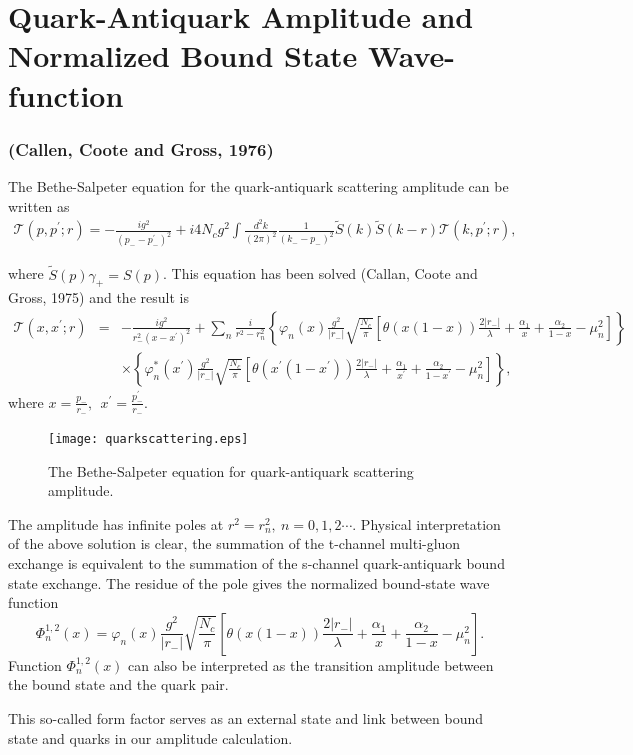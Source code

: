 \documentclass[8pt]{beamer}
\begin{document}
\section{Quark-Antiquark Amplitude and Normalized Bound State Wave-function}
\begin{frame}
	\frametitle{\insertsectionhead (Callen, Coote and Gross, 1976)}
	The Bethe-Salpeter equation for the quark-antiquark scattering amplitude can be written as
	\begin{eqnarray}
		\mathcal{T}(p,p^\prime;r)=-\frac{ig^2}{(p_{-}-p_{-}^\prime)^2}
		+i4N_c
		g^2\int\frac{d^2k}{(2\pi)^2}\frac{1}{(k_{-}-p_{-})^2}\tilde{S}(k)\tilde{S}(k-r)\mathcal{T}(k,p^\prime;r),\label{quarkeq}
	\end{eqnarray}

	where $\tilde{S}(p)\gamma_+=S(p)$. This equation has been solved (Callan, Coote and Gross, 1975) and the result is
	\small
	\begin{eqnarray}
		\mathcal{T}(x,x^\prime;r)
		&=&-\frac{ig^2}{r_{-}^2(x-x^\prime)^2}+\sum_{n}\frac{i}{r^2-r_{n}^2}\left\{\varphi_{n}(x)\frac{g^2}{|r_{-}|}
		\sqrt{\frac{N_c}{\pi}}\left[\theta(x(1-x))\frac{2|r_{-}|}{\lambda}+\frac{\alpha_1}{x}+\frac{\alpha_2}{1-x}-\mu_{n}^2\right]\right\}\nonumber\\
		&&\times\left\{\varphi_n^{\ast}(x^\prime)\frac{g^2}{|r_{-}|}\sqrt{\frac{N_c}{\pi}}
		\left[\theta(x^\prime(1-x^\prime))\frac{2|r_{-}|}{\lambda}+\frac{\alpha_1}{x^\prime}+\frac{\alpha_2}{1-x^\prime}-\mu_n^2\right]\right\},\label{qqamp}
	\end{eqnarray}
	\normalsize
	where $x=\frac{p_-}{r_-},\ \  x^\prime=\frac{p_-^\prime}{r_-}.$

\end{frame}

\begin{frame}
	\begin{figure}[hbt]
		\begin{center}
			\texttt{[image: quarkscattering.eps]}\\
			\caption{The Bethe-Salpeter equation for quark-antiquark scattering amplitude.}\label{quarkscattering}
		\end{center}
	\end{figure}
	The
	amplitude has infinite poles at $r^2=r_n^2,\ n=0,1,2\cdots$.
	Physical interpretation of the above solution is clear, the
	summation of the t-channel multi-gluon exchange is equivalent to the
	summation of the s-channel quark-antiquark bound state exchange. The
	residue of the pole gives the normalized bound-state wave function
	\begin{equation}
		\Phi^{1,2}_{n}(x)=\varphi_{n}(x)\frac{g^2}{|r_{-}|}
		\sqrt{\frac{N_c}{\pi}}\left[\theta(x(1-x))\frac{2|r_{-}|}{\lambda}+\frac{\alpha_1}{x}+\frac{\alpha_2}{1-x}-\mu_{n}^2\right].
	\end{equation}
	Function $\Phi^{1,2}_n(x)$ can also be interpreted as the transition
	amplitude between the bound state and the quark pair.

	This so-called form factor serves as an external state and link between bound state and quarks in our amplitude calculation.
\end{frame}
\end{document}
